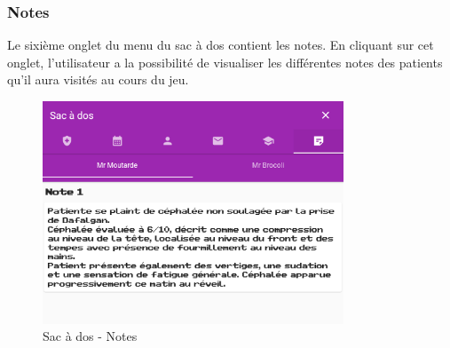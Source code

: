 \subsubsection*{Notes}

Le sixième onglet du menu du sac à dos contient les notes. En cliquant sur cet onglet, l'utilisateur a la possibilité de visualiser les différentes notes des patients qu'il aura visités au cours du jeu. \\

\begin{figure}[H]
    \centering
    \includegraphics[width=0.8\textwidth ]{images/toolsMenu/notes.png}
    \caption{Sac à dos - Notes}
    \label{fig:pic_dessus}
\end{figure}
